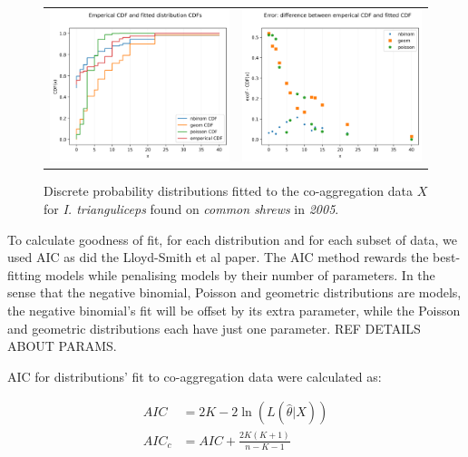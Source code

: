 \documentclass{article}
\begin{document}
\begin{figure}[h!]
	\centering
	\begin{tabular}{ll}
	\includegraphics[width=.48\linewidth,valign=m]{CDF_compare_2005_I.trianguliceps_SA} & \includegraphics[width=.48\linewidth,valign=m]{CDF_errors_2005_I.trianguliceps_SA}
	\end{tabular}
		\caption{Discrete probability distributions fitted to the co-aggregation data $ X $ for \textit{I. trianguliceps} found on \textit{common shrews} in \textit{2005}.}
	\label{fig:kielder_2005_itrianguliceps_SA}
\end{figure}

To calculate goodness of fit, for each distribution and for each subset of data, we used AIC as did the Lloyd-Smith et al paper. The AIC method rewards the best-fitting models while penalising models by their number of parameters. In the sense that the negative binomial, Poisson and geometric distributions are models, the negative binomial's fit will be offset by its extra parameter, while the Poisson and geometric distributions each have just one parameter. REF DETAILS ABOUT PARAMS.

AIC for distributions' fit to co-aggregation data were calculated as:

\begin{align} \label{AIC}
    AIC &= 2K - 2\ln(L(\hat \theta | X)) \nonumber \\
    AIC_c &= AIC + \frac{2K(K+1)}{n-K-1}
\end{align}
\end{document}
